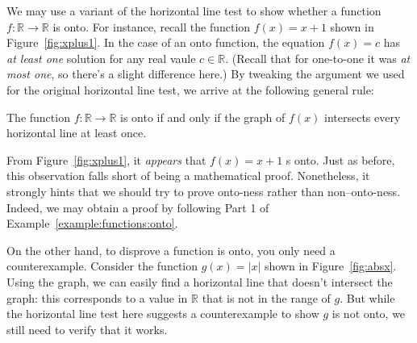 % 

\begin{rem}
We may use a variant of the horizontal line test to show whether a function $f:\mathbb{R} \rightarrow \mathbb{R}$ is onto.  
For instance, recall the function $f(x)=x +1$ shown in Figure~\ref{fig:xplus1}. In the case of an onto function, the equation $f(x)=c$ has \emph{at least one} solution for any real vaule $c \in \mathbb{R}$.  (Recall that for one-to-one it was \emph{at most one}, so there's a slight difference here.) By tweaking the argument we used for the original horizontal line test, we arrive at the following general rule:
\bigskip

\noindent 
The function $f:\mathbb{R} \rightarrow \mathbb{R}$ is onto if and only if the graph of $f(x)$ intersects every horizontal line at least once.
\bigskip

From Figure~\ref{fig:xplus1}, it \emph{appears} that $f(x)=x+1$ s onto. Just as before, this observation falls short of being a mathematical proof. Nonetheless, it strongly hints that we should try to prove onto-ness rather than non--onto-ness. Indeed, we may obtain a proof by following Part 1 of Example~\ref{example:functions:onto}.

On the other hand, to disprove a function is onto, you only need a counterexample.  Consider the function $g(x)= |x|$ shown in Figure~\ref{fig:absx}. Using the graph, we can easily find a horizontal line that doesn't intersect the graph: this corresponds to a value in $\mathbb{R}$ that is not in the range of $g$.  But while the horizontal line test here suggests a counterexample to show $g$ is not onto, we still need to verify that it works.
\end{rem}    

